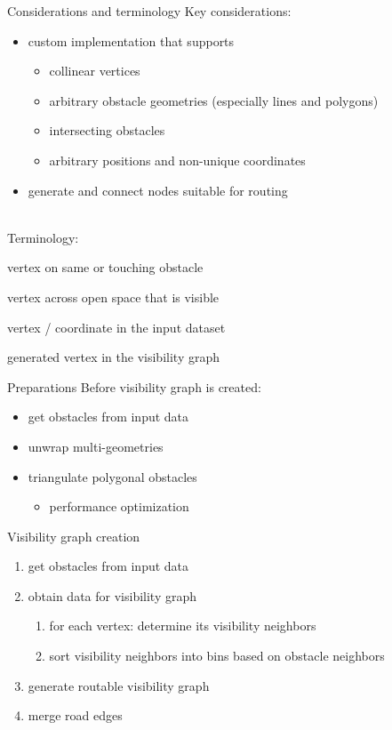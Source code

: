 \documentclass[xcolor={x11names}]{beamer}
\renewcommand{\n}{\hfill\\[0.5ex]}
\newcommand{\nn}{\hfill\\[2ex]}
\begin{document}
		\begin{frame}{Considerations and terminology}
			Key considerations:\n
			\begin{itemize}
				\item custom implementation that supports
				\begin{itemize}
					\item collinear vertices
					\item arbitrary obstacle geometries (especially lines and polygons)
					\item intersecting obstacles
					\item arbitrary positions and non-unique coordinates
				\end{itemize}
				\item generate and connect nodes suitable for routing
			\end{itemize}
			\nn
			\pause
			Terminology:\n
			\begin{description}
				\item[obstacle neighbor] vertex on same or touching obstacle
				\item[visibility neighbor] vertex across open space that is visible
				\item[input vertex] vertex / coordinate in the input dataset
				\item[output vertex] generated vertex in the visibility graph
			\end{description}
		\end{frame}
		
		\begin{frame}{Preparations}
			Before visibility graph is created:\n
			\begin{itemize}
				\item get obstacles from input data
				\item unwrap multi-geometries
				\item triangulate polygonal obstacles
				\begin{itemize}
					\item[\textrightarrow] performance optimization
				\end{itemize}
			\end{itemize}
		\end{frame}
		
		\begin{frame}{Visibility graph creation}
			\begin{enumerate}
				\item get obstacles from input data
				\item obtain data for visibility graph
				\begin{enumerate}
					\item for each vertex: determine its visibility neighbors
					\item sort visibility neighbors into bins based on obstacle neighbors
				\end{enumerate}
				\item generate routable visibility graph
				\item merge road edges
			\end{enumerate}
		\end{frame}
		
\end{document}
